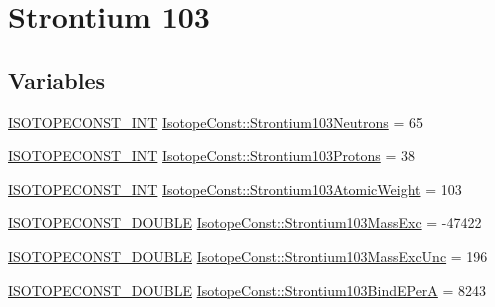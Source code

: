 \hypertarget{group___isotope_const-_strontium-_sr103}{}\section{Strontium 103}
\label{group___isotope_const-_strontium-_sr103}
\subsection*{Variables}
\begin{DoxyCompactItemize}
\item 
\mbox{\hyperlink{group___isotope_const-_macros_ga5f18360b3e99483a35c32d789e62621c}{I\+S\+O\+T\+O\+P\+E\+C\+O\+N\+S\+T\+\_\+\+I\+NT}} \mbox{\hyperlink{group___isotope_const-_strontium-_sr103_ga177ac6217be5572ecfdc67414628f852}{Isotope\+Const\+::\+Strontium103\+Neutrons}} = 65
\item 
\mbox{\hyperlink{group___isotope_const-_macros_ga5f18360b3e99483a35c32d789e62621c}{I\+S\+O\+T\+O\+P\+E\+C\+O\+N\+S\+T\+\_\+\+I\+NT}} \mbox{\hyperlink{group___isotope_const-_strontium-_sr103_ga9720e9cecdfb08a233839ee44e38b19b}{Isotope\+Const\+::\+Strontium103\+Protons}} = 38
\item 
\mbox{\hyperlink{group___isotope_const-_macros_ga5f18360b3e99483a35c32d789e62621c}{I\+S\+O\+T\+O\+P\+E\+C\+O\+N\+S\+T\+\_\+\+I\+NT}} \mbox{\hyperlink{group___isotope_const-_strontium-_sr103_ga17abfdac55a2e24aa2b4e3bc80ba1e48}{Isotope\+Const\+::\+Strontium103\+Atomic\+Weight}} = 103
\item 
\mbox{\hyperlink{group___isotope_const-_macros_ga8f45a7272ce02c0b4c65c44636ed719a}{I\+S\+O\+T\+O\+P\+E\+C\+O\+N\+S\+T\+\_\+\+D\+O\+U\+B\+LE}} \mbox{\hyperlink{group___isotope_const-_strontium-_sr103_ga057f85aaf768f5d4ffd4f433ec3835a2}{Isotope\+Const\+::\+Strontium103\+Mass\+Exc}} = -\/47422
\item 
\mbox{\hyperlink{group___isotope_const-_macros_ga8f45a7272ce02c0b4c65c44636ed719a}{I\+S\+O\+T\+O\+P\+E\+C\+O\+N\+S\+T\+\_\+\+D\+O\+U\+B\+LE}} \mbox{\hyperlink{group___isotope_const-_strontium-_sr103_ga66cc548a748112cb04eb602e6e0809c5}{Isotope\+Const\+::\+Strontium103\+Mass\+Exc\+Unc}} = 196
\item 
\mbox{\hyperlink{group___isotope_const-_macros_ga8f45a7272ce02c0b4c65c44636ed719a}{I\+S\+O\+T\+O\+P\+E\+C\+O\+N\+S\+T\+\_\+\+D\+O\+U\+B\+LE}} \mbox{\hyperlink{group___isotope_const-_strontium-_sr103_ga52bf156ab9d8d68d5c5b358a14e4aaa8}{Isotope\+Const\+::\+Strontium103\+Bind\+E\+PerA}} = 8243
\item 

\end{DoxyCompactItemize}
